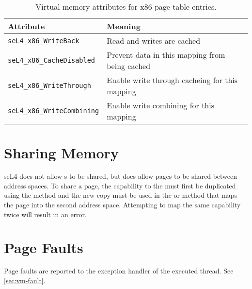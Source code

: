 \begin{table}[htb]
  \begin{center}
    \begin{tabularx}{\textwidth}{p{}X}
      \toprule
      Attribute & Meaning \\
      \midrule
      \texttt{seL4\_x86\_WriteBack} & Read and writes are cached \\
      \texttt{seL4\_x86\_CacheDisabled} & Prevent data in this mapping
      from being cached \\
      \texttt{seL4\_x86\_WriteThrough} & Enable write through cacheing for this mapping \\
      \texttt{seL4\_x86\_WriteCombining} & Enable write combining for this mapping \\
      \bottomrule
    \end{tabularx}
    \caption{\label{tbl:vmattr_ia32} Virtual memory attributes for x86 page
      table entries.}
  \end{center}
\end{table}

\section{Sharing Memory}

seL4 does not allow s to be shared, but does allow
pages to be shared between address spaces. 
To share a page, the capability to the 
 must first be
duplicated using the  method and the new copy must
be used in the  \ifxeightsix or  \fi method that maps the page into the second
address space. Attempting to map the same capability
twice will result in an error. 


\section{Page Faults}

Page faults are reported to the exception handler of the executed thread.
See \autoref{sec:vm-fault}.
